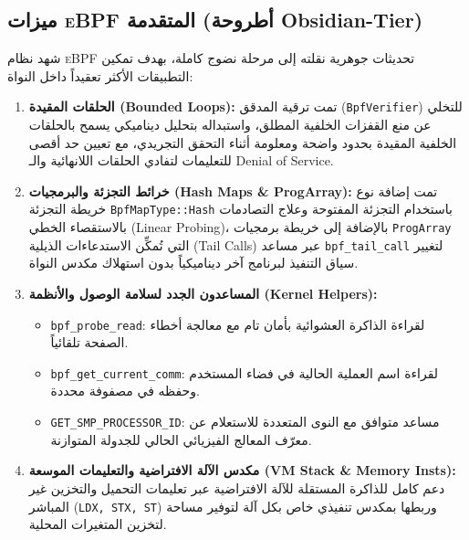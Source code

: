 \documentclass[12pt,a4paper]{article}
\theoremstyle{definition}
\newcommand{\codeinline}[1]{\texttt{\small #1}}
\newcommand{\en}[1]{\textenglish{#1}}
\begin{document}
\subsection{ميزات \textsc{eBPF} المتقدمة (أطروحة \en{Obsidian-Tier})}

شهد نظام \textsc{eBPF} تحديثات جوهرية نقلته إلى مرحلة نضوج كاملة، بهدف تمكين التطبيقات الأكثر تعقيداً داخل النواة:

\begin{enumerate}[leftmargin=2em]
\item \textbf{الحلقات المقيدة (\en{Bounded Loops}):} 
تمت ترقية المدقق (\codeinline{BpfVerifier}) للتخلي عن منع القفزات الخلفية المطلق، واستبداله بتحليل ديناميكي يسمح بالحلقات الخلفية المقيدة بحدود واضحة ومعلومة أثناء التحقق التجريدي، مع تعيين حد أقصى للتعليمات لتفادي الحلقات اللانهائية والـ \en{Denial of Service}.

\item \textbf{خرائط التجزئة والبرمجيات (\en{Hash Maps \& ProgArray}):}
تمت إضافة نوع خريطة التجزئة \codeinline{BpfMapType::Hash} باستخدام التجزئة المفتوحة وعلاج التصادمات بالاستقصاء الخطي (\en{Linear Probing})، بالإضافة إلى خريطة برمجيات \codeinline{ProgArray} التي تُمكِّن الاستدعاءات الذيلية (\en{Tail Calls}) عبر مساعد \codeinline{bpf\_tail\_call} لتغيير سياق التنفيذ لبرنامج آخر ديناميكياً بدون استهلاك مكدس النواة.

\item \textbf{المساعدون الجدد لسلامة الوصول والأنظمة (\en{Kernel Helpers}):}
\begin{itemize}
\item \codeinline{bpf\_probe\_read}: لقراءة الذاكرة العشوائية بأمان تام مع معالجة أخطاء الصفحة تلقائياً.
\item \codeinline{bpf\_get\_current\_comm}: لقراءة اسم العملية الحالية في فضاء المستخدم وحفظه في مصفوفة محددة.
\item \codeinline{GET\_SMP\_PROCESSOR\_ID}: مساعد متوافق مع النوى المتعددة للاستعلام عن معرّف المعالج الفيزيائي الحالي للجدولة المتوازنة.
\end{itemize}

\item \textbf{مكدس الآلة الافتراضية والتعليمات الموسعة (\en{VM Stack \& Memory Insts}):}
دعم كامل للذاكرة المستقلة للآلة الافتراضية عبر تعليمات التحميل والتخزين غير المباشر (\codeinline{LDX, STX, ST}) وربطها بمكدس تنفيذي خاص بكل آلة لتوفير مساحة لتخزين المتغيرات المحلية.
\end{enumerate}

\newpage
\end{document}

